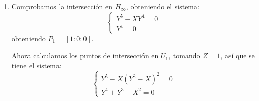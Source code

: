 \begin{enumerate}
Por sustitución se obtiene $(X+Y)^2=X^2+2XY+Y^2=0$, siendo las soluciones del tipo $(\lambda,-\lambda), \lambda \in k$, para finalmente obtener $\lambda =0$. Así que el único punto de intersección en $U_1$ es $P_1=[0:0:1]$.

Ahora veamos los puntos de intersección en $H_\infty$, consideramos $Z=0$ y obtenemos el sistema de ecuaciones:

\begin{equation*}
\left\{\begin{array}{ll}
        X^3+Y^3=0 \\
         X^3+Y^3=0
       \end{array} \right.
\end{equation*}


Obtenemos los puntos 
$$P_1=[0:0:1],P_2=[1:-1:0],P_3=[1:\frac{1+\sqrt{3}i}{2}:0],P_4=[1:-\frac{\sqrt{3}i-1}{2}:0]$$

Calculamos las intersecciones:

$I(P_1,F\cap G)=I(P_0,X^2+Y^2+X^3+Y^3\cap X^3+Y^3-2XY)=I(P_0,X^2+Y^2+2XY\cap X^3+Y^3-2XY)=I(P_0,(X+Y)^2\cap X^3+Y^3-2XY)=2I(P_0,X+Y\cap XY)=4$.

$I(P_2,F\cap G)=I((-1,0),(1+Y^2)Z+1+Y^3\cap 1+Y^3-2XY)=I((-1,0),(1+Y^2)Z+2YZ\cap 1+Y^3-2YZ)=I(P_0,(1+(Y-1)^2)Z+2(Y-1)Z\cap 1+(Y-1)^3-2(Y-1)Z)=I(P_0,Y^2Z\cap Y^3-3Y^2-2YZ+3Y+2Z)=2I(P_0,Y\cap 2Z)+I(P_0,Z\cap Y^3-3Y^2+3Y)=2+1=3$

Así que por el teorema de Bézout, como $deg(F)deg(G)=9$, sabemos que deben intersecar transversalmente en los otros dos puntos de intersección. 

\item Comprobamos la intersección en $H_\infty$, obteniendo el sistema:
\begin{equation*}
\left\{\begin{array}{ll}
        Y^5-XY^4=0 \\
        Y^4 = 0
       \end{array} \right.
\end{equation*}
obteniendo $P_1=[1:0:0]$.

Ahora calculamos los puntos de intersección en $U_1$, tomando $Z=1$, así que se tiene el sistema:
\begin{equation*}
\left\{\begin{array}{ll}
         Y^5-X(Y^2-X)^2=0 \\
         Y^4+Y^3-X^2 = 0
       \end{array} \right.
\end{equation*}


\end{enumerate}

